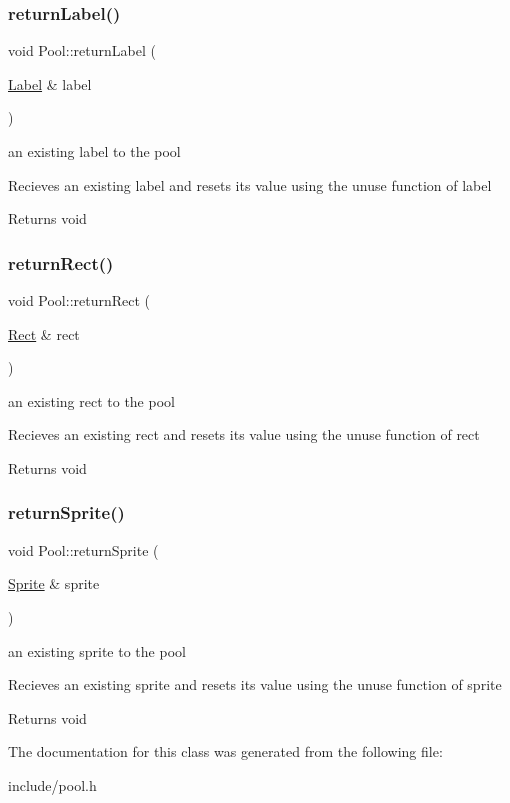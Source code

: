 \subsubsection{\texorpdfstring{return\+Label()}{returnLabel()}}
{\footnotesize\ttfamily void Pool\+::return\+Label (\begin{DoxyParamCaption}\item[{\hyperlink{class_label}{Label} \&}]{label }\end{DoxyParamCaption})}

an existing label to the pool

Recieves an existing label and resets it\textquotesingle{}s value using the unuse function of label

\begin{DoxyReturn}{Returns}
void 
\end{DoxyReturn}
\mbox{\label{class_pool_a3b5250c08babf163d9d4877c7a2a6f40}} 
\subsubsection{\texorpdfstring{return\+Rect()}{returnRect()}}
{\footnotesize\ttfamily void Pool\+::return\+Rect (\begin{DoxyParamCaption}\item[{\hyperlink{class_rect}{Rect} \&}]{rect }\end{DoxyParamCaption})}

an existing rect to the pool

Recieves an existing rect and resets it\textquotesingle{}s value using the unuse function of rect

\begin{DoxyReturn}{Returns}
void 
\end{DoxyReturn}
\mbox{\label{class_pool_a227334c0983a0c1bf42d72a44fcfee8f}} 
\subsubsection{\texorpdfstring{return\+Sprite()}{returnSprite()}}
{\footnotesize\ttfamily void Pool\+::return\+Sprite (\begin{DoxyParamCaption}\item[{\hyperlink{class_sprite}{Sprite} \&}]{sprite }\end{DoxyParamCaption})}

an existing sprite to the pool

Recieves an existing sprite and resets it\textquotesingle{}s value using the unuse function of sprite

\begin{DoxyReturn}{Returns}
void 
\end{DoxyReturn}


The documentation for this class was generated from the following file\+:\begin{DoxyCompactItemize}
\item 
include/pool.\+h\end{DoxyCompactItemize}

